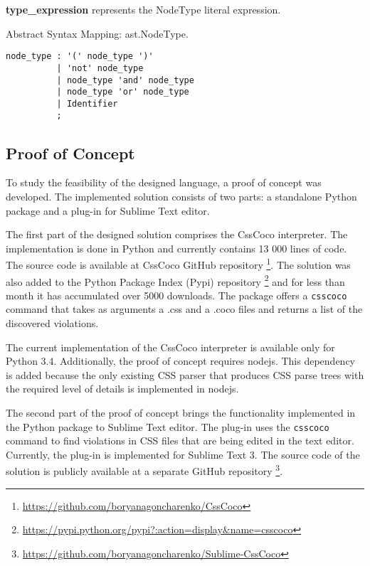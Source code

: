 \begin{description}
\item\textbf{type\_expression} represents the NodeType literal expression.

Abstract Syntax Mapping: ast.NodeType.

\begin{snippet}
\begin{verbatim}
node_type : '(' node_type ')'
          | 'not' node_type
          | node_type 'and' node_type
          | node_type 'or' node_type
          | Identifier
          ;
\end{verbatim}
\end{snippet}

\end{description}

\subsection{Proof of Concept}

To study the feasibility of the designed language, a proof of concept was
developed. The implemented solution consists of two parts: a standalone
Python package and a plug-in for Sublime Text editor.

The first part of the designed solution comprises the CssCoco
interpreter. The implementation is done in Python and currently contains 13
000 lines of code. The source code is available at CssCoco GitHub repository
\footnote{\url{https://github.com/boryanagoncharenko/CssCoco}}. The solution was also
added to the Python Package Index (Pypi) repository
\footnote{\url{https://pypi.python.org/pypi?:action=display&name=csscoco}}
and for less than month it has accumulated over 5000 downloads. The package offers a \texttt{csscoco} command that takes as
arguments a .css and a .coco files and returns a list of the discovered violations.

The current implementation of the CssCoco interpreter is available only for
Python 3.4. Additionally, the proof of concept requires nodejs. This
dependency is added because the only existing CSS parser that produces CSS
parse trees with the required level of details is implemented in nodejs.

The second part of the proof of concept brings the functionality implemented
in the Python package to Sublime Text editor. The plug-in uses the
\texttt{csscoco} command to find violations in CSS files that are being edited
in the text editor. Currently, the plug-in is implemented for Sublime Text 3.
The source code of the solution is publicly available at a separate GitHub repository
\footnote{\url{https://github.com/boryanagoncharenko/Sublime-CssCoco}}.

